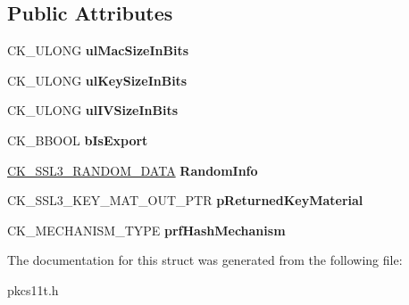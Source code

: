 \subsection*{Public Attributes}
\begin{DoxyCompactItemize}
\item 
\mbox{\label{struct_c_k___t_l_s12___k_e_y___m_a_t___p_a_r_a_m_s_ab5fba4573464b3d1c94bc8c54be4f2ce}} 
C\+K\+\_\+\+U\+L\+O\+NG {\bfseries ul\+Mac\+Size\+In\+Bits}
\item 
\mbox{\label{struct_c_k___t_l_s12___k_e_y___m_a_t___p_a_r_a_m_s_a721a1d07131ecbec8610be37b6a5d6bc}} 
C\+K\+\_\+\+U\+L\+O\+NG {\bfseries ul\+Key\+Size\+In\+Bits}
\item 
\mbox{\label{struct_c_k___t_l_s12___k_e_y___m_a_t___p_a_r_a_m_s_a7b056ccf74aa1baa1d9f3fb2ef201f66}} 
C\+K\+\_\+\+U\+L\+O\+NG {\bfseries ul\+I\+V\+Size\+In\+Bits}
\item 
\mbox{\label{struct_c_k___t_l_s12___k_e_y___m_a_t___p_a_r_a_m_s_ac894353a02b1c63d4de5f1efa1b95f73}} 
C\+K\+\_\+\+B\+B\+O\+OL {\bfseries b\+Is\+Export}
\item 
\mbox{\label{struct_c_k___t_l_s12___k_e_y___m_a_t___p_a_r_a_m_s_aa4eccdc906985cd83579e707a48f62c0}} 
\hyperlink{struct_c_k___s_s_l3___r_a_n_d_o_m___d_a_t_a}{C\+K\+\_\+\+S\+S\+L3\+\_\+\+R\+A\+N\+D\+O\+M\+\_\+\+D\+A\+TA} {\bfseries Random\+Info}
\item 
\mbox{\label{struct_c_k___t_l_s12___k_e_y___m_a_t___p_a_r_a_m_s_a191bbf52b667fa049a645bb4e7443320}} 
C\+K\+\_\+\+S\+S\+L3\+\_\+\+K\+E\+Y\+\_\+\+M\+A\+T\+\_\+\+O\+U\+T\+\_\+\+P\+TR {\bfseries p\+Returned\+Key\+Material}
\item 
\mbox{\label{struct_c_k___t_l_s12___k_e_y___m_a_t___p_a_r_a_m_s_a74161cfccbd5f17886cec64ec28d592d}} 
C\+K\+\_\+\+M\+E\+C\+H\+A\+N\+I\+S\+M\+\_\+\+T\+Y\+PE {\bfseries prf\+Hash\+Mechanism}
\end{DoxyCompactItemize}


The documentation for this struct was generated from the following file\+:\begin{DoxyCompactItemize}
\item 
pkcs11t.\+h\end{DoxyCompactItemize}
